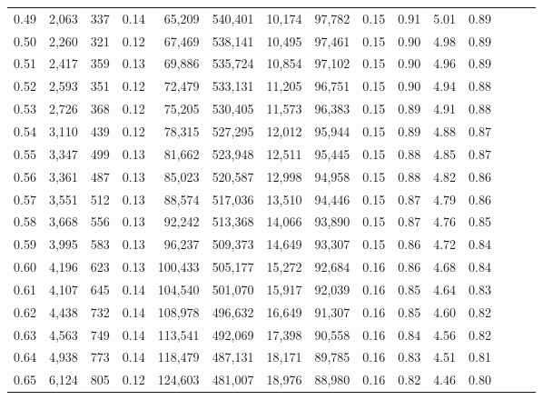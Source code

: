 \begin{tabular}{rrrrrrrrrrrrrrr}
0.49 &   2,063 &     337 &  0.14 &   65,209 &  540,401 &   10,174 &   97,782 &  0.15 &  0.91 &  5.01 &      0.89 \\
0.50 &   2,260 &     321 &  0.12 &   67,469 &  538,141 &   10,495 &   97,461 &  0.15 &  0.90 &  4.98 &      0.89 \\
0.51 &   2,417 &     359 &  0.13 &   69,886 &  535,724 &   10,854 &   97,102 &  0.15 &  0.90 &  4.96 &      0.89 \\
0.52 &   2,593 &     351 &  0.12 &   72,479 &  533,131 &   11,205 &   96,751 &  0.15 &  0.90 &  4.94 &      0.88 \\
0.53 &   2,726 &     368 &  0.12 &   75,205 &  530,405 &   11,573 &   96,383 &  0.15 &  0.89 &  4.91 &      0.88 \\
0.54 &   3,110 &     439 &  0.12 &   78,315 &  527,295 &   12,012 &   95,944 &  0.15 &  0.89 &  4.88 &      0.87 \\
0.55 &   3,347 &     499 &  0.13 &   81,662 &  523,948 &   12,511 &   95,445 &  0.15 &  0.88 &  4.85 &      0.87 \\
0.56 &   3,361 &     487 &  0.13 &   85,023 &  520,587 &   12,998 &   94,958 &  0.15 &  0.88 &  4.82 &      0.86 \\
0.57 &   3,551 &     512 &  0.13 &   88,574 &  517,036 &   13,510 &   94,446 &  0.15 &  0.87 &  4.79 &      0.86 \\
0.58 &   3,668 &     556 &  0.13 &   92,242 &  513,368 &   14,066 &   93,890 &  0.15 &  0.87 &  4.76 &      0.85 \\
0.59 &   3,995 &     583 &  0.13 &   96,237 &  509,373 &   14,649 &   93,307 &  0.15 &  0.86 &  4.72 &      0.84 \\
0.60 &   4,196 &     623 &  0.13 &  100,433 &  505,177 &   15,272 &   92,684 &  0.16 &  0.86 &  4.68 &      0.84 \\
0.61 &   4,107 &     645 &  0.14 &  104,540 &  501,070 &   15,917 &   92,039 &  0.16 &  0.85 &  4.64 &      0.83 \\
0.62 &   4,438 &     732 &  0.14 &  108,978 &  496,632 &   16,649 &   91,307 &  0.16 &  0.85 &  4.60 &      0.82 \\
0.63 &   4,563 &     749 &  0.14 &  113,541 &  492,069 &   17,398 &   90,558 &  0.16 &  0.84 &  4.56 &      0.82 \\
0.64 &   4,938 &     773 &  0.14 &  118,479 &  487,131 &   18,171 &   89,785 &  0.16 &  0.83 &  4.51 &      0.81 \\
0.65 &   6,124 &     805 &  0.12 &  124,603 &  481,007 &   18,976 &   88,980 &  0.16 &  0.82 &  4.46 &      0.80 \\

\end{tabular}
